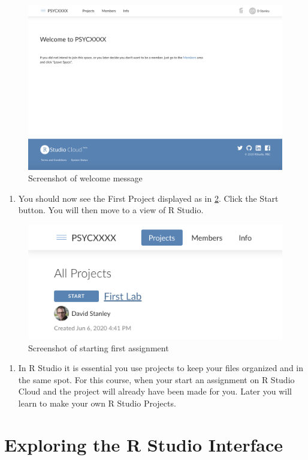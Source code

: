 \documentclass[
]{krantz}
\providecommand{\tightlist}{%
  \setlength{\itemsep}{0pt}\setlength{\parskip}{0pt}}
\begin{document}
\begin{figure}
\includegraphics[width=0.7\linewidth]{ch_introduction/images/screenshot_welcome} \caption{Screenshot of welcome message}\label{fig:welcome}
\end{figure}

\begin{enumerate}
\def\labelenumi{\arabic{enumi}.}
\setcounter{enumi}{4}
\tightlist
\item
  You should now see the First Project displayed as in \ref{fig:assignment}. Click the Start button. You will then move to a view of R Studio.
\end{enumerate}

\begin{figure}
\includegraphics[width=0.7\linewidth]{ch_introduction/images/screenshot_assignment} \caption{Screenshot of starting first assignment}\label{fig:assignment}
\end{figure}

\begin{enumerate}
\def\labelenumi{\arabic{enumi}.}
\setcounter{enumi}{4}
\tightlist
\item
  In R Studio it is essential you use projects to keep your files organized and in the same spot. For this course, when your start an assignment on R Studio Cloud and the project will already have been made for you. Later you will learn to make your own R Studio Projects.
\end{enumerate}

\hypertarget{exploring-the-r-studio-interface}{%
\section{Exploring the R Studio Interface}\label{exploring-the-r-studio-interface}}
\end{document}
